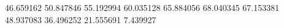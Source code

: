 46.659162
50.847846
55.192994
60.035128
65.884056
68.040345
67.153381
48.937083
36.496252
21.555691
7.439927
